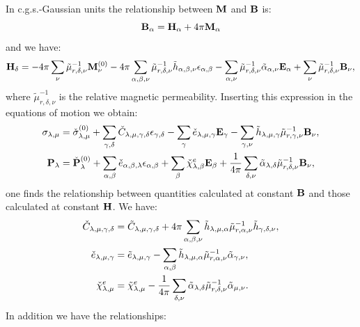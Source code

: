 \documentclass[12pt,a4paper,twoside]{report}
\begin{document}
\newpage
{\color{orange}
In c.g.s.-Gaussian units the relationship between 
${\bf M}$ and ${\bf B}$ is:
\begin{equation}
{\bf B}_\alpha= {\bf H}_\alpha+ 4 \pi {\bf M}_\alpha
\end{equation}
and we have:
\begin{equation}
{\bf H}_\delta = - 4 \pi \sum_\nu \tilde \mu^{-1}_{r,\delta,\nu} 
{\bf M}^{(0)}_\nu
- 4 \pi \sum_{\alpha,\beta,\nu} \tilde \mu^{-1}_{r,\delta,\nu} 
\tilde h_{\alpha,\beta,\nu}
\epsilon_{\alpha,\beta} - \sum_{\alpha,\nu}
\tilde \mu^{-1}_{r,\delta,\nu} \tilde \alpha_{\alpha,\nu} {\bf E}_\alpha
+ \sum_\nu \tilde \mu^{-1}_{r,\delta,\nu} {\bf B}_\nu, 
\end{equation}
where $\tilde \mu^{-1}_{r,\delta,\nu}$ is the relative magnetic
permeability.
Inserting this expression in the equations of motion we obtain:
\begin{align}
\sigma_{\lambda,\mu}&= \check \sigma_{\lambda,\mu}^{(0)}
+\sum_{\gamma,\delta} \check C_{\lambda,\mu,\gamma,\delta}  
\epsilon_{\gamma,\delta} -
\sum_{\gamma} \check e_{\lambda,\mu,\gamma} 
 {\bf E}_{\gamma}
-\sum_{\gamma,\nu}  \tilde h_{\lambda,\mu,\gamma} 
\tilde \mu^{-1}_{r,\gamma,\nu} {\bf B}_{\nu}, \\
{\bf P}_{\lambda}&= \check {\bf P}^{(0)}_{\lambda}
+\sum_{\alpha,\beta} \check e_{\alpha,\beta,\lambda} 
\epsilon_{\alpha,\beta} +
\sum_{\beta} 
\check \chi^e_{\lambda,\beta}
{\bf E}_{\beta} +
{1\over 4 \pi} \sum_{\delta,\nu} \tilde \alpha_{\lambda,\delta} 
\tilde \mu^{-1}_{r,\delta,\nu}  
{\bf B}_{\nu}, 
\end{align}
one finds the relationship between quantities calculated at constant 
${\bf B}$ and those calculated at constant ${\bf H}$. We have:
\begin{align}
\check C_{\lambda,\mu,\gamma,\delta} &=
\tilde C_{\lambda,\mu,\gamma,\delta} + 4 \pi \sum_{\alpha,\beta,\nu}
\tilde h_{\lambda,\mu,\alpha} \tilde \mu^{-1}_{r,\alpha,\nu} 
\tilde h_{\gamma,\delta,\nu}, \\
\check e_{\lambda,\mu,\gamma}&= \tilde e_{\lambda,\mu,\gamma}
-\sum_{\alpha,\beta} \tilde h_{\lambda,\mu,\alpha} 
\tilde \mu^{-1}_{r,\alpha,\nu}
\tilde \alpha_{\gamma,\nu}, \\
\check \chi^e_{\lambda,\mu}&= \tilde \chi^e_{\lambda,\mu}
-{1\over 4 \pi} \sum_{\delta,\nu} \tilde \alpha_{\lambda,\delta} 
\tilde \mu^{-1}_{r,\delta,\nu} \tilde \alpha_{\mu,\nu}. 
\end{align}
In addition we have the relationships:
\begin{align}

\end{align}}
\end{document}
